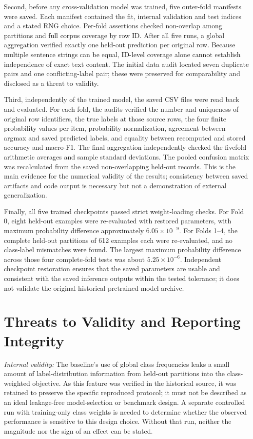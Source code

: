 \documentclass[conference]{IEEEtran}
\begin{document}
Second, before any cross-validation model was trained, five outer-fold manifests were saved. Each manifest contained the fit, internal validation and test indices and a stated RNG choice. Per-fold assertions checked non-overlap among partitions and full corpus coverage by row ID. After all five runs, a global aggregation verified exactly one held-out prediction per original row. Because multiple sentence strings can be equal, ID-level coverage alone cannot establish independence of exact text content. The initial data audit located seven duplicate pairs and one conflicting-label pair; these were preserved for comparability and disclosed as a threat to validity.

Third, independently of the trained model, the saved CSV files were read back and evaluated. For each fold, the audits verified the number and uniqueness of original row identifiers, the true labels at those source rows, the four finite probability values per item, probability normalization, agreement between argmax and saved predicted labels, and equality between recomputed and stored accuracy and macro-F1. The final aggregation independently checked the fivefold arithmetic averages and sample standard deviations. The pooled confusion matrix was recalculated from the saved non-overlapping held-out records. This is the main evidence for the numerical validity of the results; consistency between saved artifacts and code output is necessary but not a demonstration of external generalization.

Finally, all five trained checkpoints passed strict weight-loading checks. For Fold 0, eight held-out examples were re-evaluated with restored parameters, with maximum probability difference approximately $6.05\times10^{-9}$. For Folds 1--4, the complete held-out partitions of 612 examples each were re-evaluated, and no class-label mismatches were found. The largest maximum probability difference across those four complete-fold tests was about $5.25\times10^{-6}$. Independent checkpoint restoration ensures that the saved parameters are usable and consistent with the saved inference outputs within the tested tolerance; it does not validate the original historical pretrained model archive.

\section{Threats to Validity and Reporting Integrity}\label{sec:threats}
\emph{Internal validity:} The baseline's use of global class frequencies leaks a small amount of label-distribution information from held-out partitions into the class-weighted objective. As this feature was verified in the historical source, it was retained to preserve the specific reproduced protocol; it must not be described as an ideal leakage-free model-selection or benchmark design. A separate controlled run with training-only class weights is needed to determine whether the observed performance is sensitive to this design choice. Without that run, neither the magnitude nor the sign of an effect can be stated.
\end{document}
